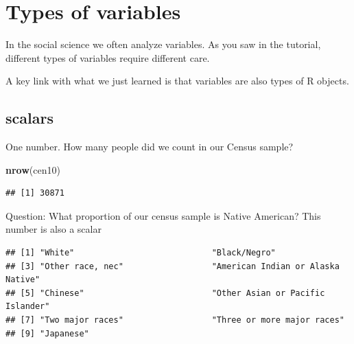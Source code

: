 \documentclass[]{book}
\newenvironment{Shaded}{\begin{snugshade}}{\end{snugshade}}
\newcommand{\KeywordTok}[1]{\textcolor[rgb]{0.13,0.29,0.53}{\textbf{#1}}}
\newcommand{\StringTok}[1]{\textcolor[rgb]{0.31,0.60,0.02}{#1}}
\newcommand{\CommentTok}[1]{\textcolor[rgb]{0.56,0.35,0.01}{\textit{#1}}}
\newcommand{\OperatorTok}[1]{\textcolor[rgb]{0.81,0.36,0.00}{\textbf{#1}}}
\newcommand{\NormalTok}[1]{#1}
\theoremstyle{definition}
\theoremstyle{definition}
\theoremstyle{definition}
\theoremstyle{remark}
\begin{document}
\section{Types of variables}\label{types-of-variables}

In the social science we often analyze variables. As you saw in the
tutorial, different types of variables require different care.

A key link with what we just learned is that variables are also types of
R objects.

\subsection{scalars}\label{scalars}

One number. How many people did we count in our Census sample?

\begin{Shaded}
\begin{Highlighting}[]
\KeywordTok{nrow}\NormalTok{(cen10)}
\end{Highlighting}
\end{Shaded}

\begin{verbatim}
## [1] 30871
\end{verbatim}

Question: What proportion of our census sample is Native American? This
number is also a scalar

\begin{Shaded}
\end{Shaded}

\begin{verbatim}
## [1] "White"                            "Black/Negro"                     
## [3] "Other race, nec"                  "American Indian or Alaska Native"
## [5] "Chinese"                          "Other Asian or Pacific Islander" 
## [7] "Two major races"                  "Three or more major races"       
## [9] "Japanese"
\end{verbatim}

\begin{Shaded}
\end{Shaded}
\end{document}
